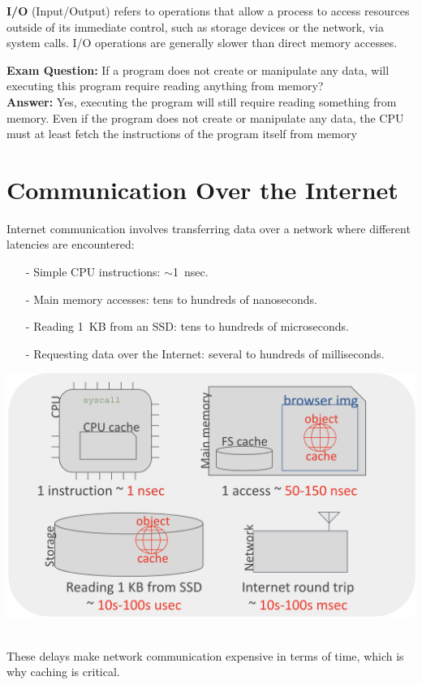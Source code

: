 \vfill
\begin{definition}[I/O]
\textbf{I/O} (Input/Output) refers to operations that allow a process to access resources outside of its immediate control, such as storage devices or the network, via system calls. I/O operations are generally slower than direct memory accesses.
\end{definition}
\vspace{0.5em}
\textbf{Exam Question:} If a program does not create or manipulate any data, will executing this program require reading anything from memory?\\[0.5em]
\textbf{Answer:} Yes, executing the program will still require reading something from memory. Even if the program does not create or manipulate any data, the CPU must at least fetch the instructions of the program itself from memory

\newpage
\vfill
\section{Communication Over the Internet}
Internet communication involves transferring data over a network where different latencies are encountered: \\
\begin{minipage}{0.45\textwidth}
  \begin{itemize}
    \item[-] Simple CPU instructions: \(\sim\)1~nsec.
    \item[-] Main memory accesses: tens to hundreds of nanoseconds.
    \item[-] Reading 1~KB from an SSD: tens to hundreds of microseconds.
    \item[-] Requesting data over the Internet: several to hundreds of milliseconds.
\end{itemize}
\end{minipage}
\hfill
\vline
\hfill
\begin{minipage}{0.45\textwidth}
\begin{center}
  \includegraphics[width=1.15\textwidth]{chapters/L1/images/internet.png}
\end{center}
\end{minipage}\\[5px]
These delays make network communication expensive in terms of time, which is why caching is critical.
\vfill
